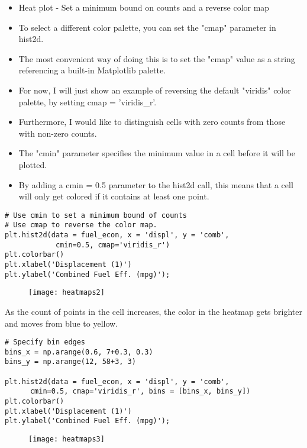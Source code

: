 \documentclass[12pt]{beamer}
\begin{document}
    \begin{frame}{}
    	\begin{itemize}
    		\item Heat plot - Set a minimum bound on counts and a reverse color map
    		\item To select a different color palette, you can set the "cmap" parameter in hist2d. 
    		\item The most convenient way of doing this is to set the "cmap" value as a string referencing a built-in Matplotlib palette.
    		\item For now, I will just show an example of reversing the default "viridis" color palette, by setting cmap = 'viridis\_r'.
    		\item Furthermore, I would like to distinguish cells with zero counts from those with non-zero counts. 
    		\item The "cmin" parameter specifies the minimum value in a cell before it will be plotted. 
    		\item By adding a cmin = 0.5 parameter to the hist2d call, this means that a cell will only get colored if it contains at least one point.
    	\end{itemize}
    
    \end{frame}
    \begin{frame}[fragile]{}
    	\fontsize{9}{1}
    	\begin{verbatim}
# Use cmin to set a minimum bound of counts 
# Use cmap to reverse the color map. 
plt.hist2d(data = fuel_econ, x = 'displ', y = 'comb', 
            cmin=0.5, cmap='viridis_r')
plt.colorbar()
plt.xlabel('Displacement (1)')
plt.ylabel('Combined Fuel Eff. (mpg)');
    	\end{verbatim}
    	\begin{figure}
    		\centering
    		\texttt{[image: heatmaps2]}
    	\end{figure}
    As the count of points in the cell increases, the color in the heatmap gets brighter and moves from blue to yellow.
    \end{frame}
    \begin{frame}[fragile]{}
    	\fontsize{10}{1}
    	\begin{verbatim}
# Specify bin edges 
bins_x = np.arange(0.6, 7+0.3, 0.3)
bins_y = np.arange(12, 58+3, 3)

plt.hist2d(data = fuel_econ, x = 'displ', y = 'comb',
      cmin=0.5, cmap='viridis_r', bins = [bins_x, bins_y])
plt.colorbar()
plt.xlabel('Displacement (1)')
plt.ylabel('Combined Fuel Eff. (mpg)');
    	\end{verbatim}
    \begin{figure}
    	\centering
    	\texttt{[image: heatmaps3]}
    \end{figure}
    \end{frame}
\end{document}
